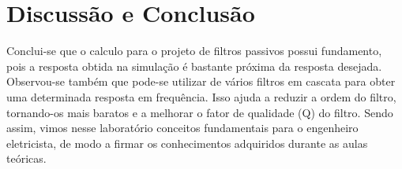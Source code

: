 \newpage
\section{Discussão e Conclusão}
Conclui-se que o calculo para o projeto de filtros passivos possui fundamento, pois a resposta obtida na simulação é bastante próxima da resposta desejada.
Observou-se também que pode-se utilizar de vários filtros em cascata para obter uma determinada resposta em frequência. Isso ajuda a reduzir a ordem do filtro, tornando-os mais baratos e a melhorar o fator de qualidade (Q) do filtro. Sendo assim, vimos nesse laboratório conceitos fundamentais para o engenheiro eletricista, de modo a firmar os conhecimentos adquiridos durante as aulas teóricas.